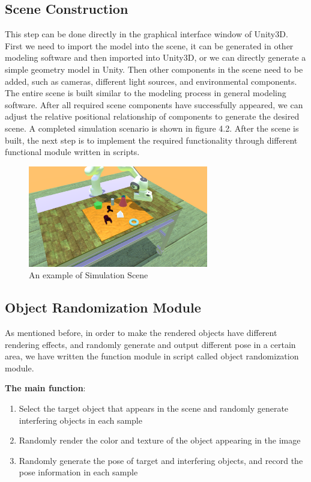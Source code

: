 \subsection{Scene Construction}
This step can be done directly in the graphical interface window of Unity3D. First we need to import the model into the scene, it can be generated in other modeling software and then imported into Unity3D, or we can directly generate a simple geometry model in Unity. Then other components in the scene need to be added, such as cameras, different light sources, and environmental components. The entire scene is built similar to the modeling process in general modeling software. After all required scene components have successfully appeared, we can adjust the relative positional relationship of components to generate the desired scene. A completed simulation scenario is shown in figure 4.2. After the scene is built, the next step is to implement the required functionality through different functional module written in scripts. 
\begin{figure}[h]
	\includegraphics[width=0.7\textwidth]{Figures/Section4_Scene.png} 
	\centering
	\captionsetup{justification=centering}
	\caption{An example of Simulation Scene}
	\label{fig:simulation_scene}
\end{figure}

\subsection{Object Randomization Module}
As mentioned before, in order to make the rendered objects have different rendering effects, and randomly generate and output different pose in a certain area, we have written the function module in script called object randomization module. 

\textbf{The main function}:
\begin{enumerate}
	\item Select the target object that appears in the scene and randomly generate interfering objects in each sample
	\item Randomly render the color and texture of the object appearing in the image
	\item Randomly generate the pose of target and interfering objects, and record the pose information in each sample  
\end{enumerate}

